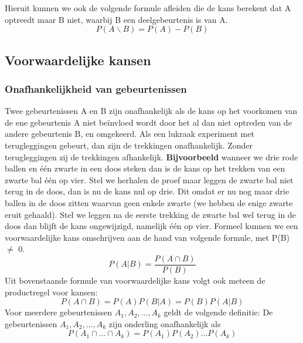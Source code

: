 \documentclass[titlepage]{article}
\numberwithin{equation}{section}
\begin{document}
 Hieruit kunnen we ook de volgende formule afleiden die de kans berekent dat A optreedt maar B niet, waarbij B een deelgebeurtenis is van A.
 \begin{equation}
 	P(A \backslash B) = P(A) - P(B)
 \end{equation}
 \subsection{Voorwaardelijke kansen}
 \subsubsection{Onafhankelijkheid van gebeurtenissen}
 Twee gebeurtenissen A en B zijn onafhankelijk als de kans op het voorkomen van de ene gebeurtenis A niet beïnvloed wordt door het al dan niet optreden van de andere gebeurtenis B, en omgekeerd.\newline
 Als een lukraak experiment met terugleggingen gebeurt, dan zijn de trekkingen onafhankelijk. Zonder terugleggingen zij de trekkingen afhankelijk. \newline\newline 
 \textbf{ Bijvoorbeeld } wanneer we drie rode ballen en één zwarte in een doos steken dan is de kans op het trekken van een zwarte bal één op vier. Stel we herhalen de proef maar leggen de zwarte bal niet terug in de doos, dan is nu de kans nul op drie. Dit omdat er nu nog maar drie ballen in de doos zitten waarvan geen enkele zwarte (we hebben de enige zwarte eruit gehaald). Stel we leggen na de eerste trekking de zwarte bal wel terug in de doos dan blijft de kans ongewijzigd, namelijk één op vier.\newline\newline
 Formeel kunnen we een voorwaardelijke kans omschrijven aan de hand van volgende formule, met P(B) $\neq$ 0.
 \begin{equation}
 	P(A|B)=\frac{P(A \cap B)}{P(B)}\label{3.5}
 \end{equation}
 Uit bovenstaande formule van voorwaardelijke kans volgt ook meteen de productregel voor kansen:
 \begin{equation}
 	P(A\cap B) = P(A)P(B|A) = P(B)P(A|B)\label{3.6}
 \end{equation}
 Voor meerdere gebeurtenissen $A_1, A_2, ... , A_k$ geldt de volgende definitie: \newline\newline
 De gebeurtenissen $A_1, A_2, ... , A_k$ zijn onderling onafhankelijk als
 \begin{equation}
 	P(A_1 \cap ... \cap A_k) = P(A_1)P(A_2) ... P(A_k)
 \end{equation}
\end{document}
